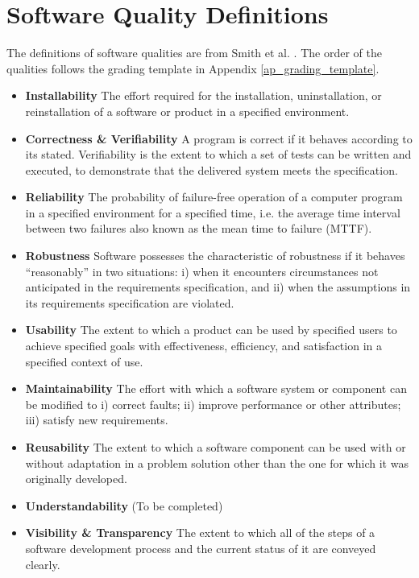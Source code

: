 \section{Software Quality Definitions}
\label{sec_software_quality}

The definitions of software qualities are from Smith et al. \cite{SmithEtAl2020}. The order of the qualities follows the grading template in Appendix \ref{ap_grading_template}.

\begin{itemize}
\item \textbf{Installability} The effort required for the installation, uninstallation, or reinstallation of a software or product in a specified environment.
\item \textbf{Correctness \& Verifiability} A program is correct if it behaves according to its stated. Verifiability is the extent to which a set of tests can be written and executed, to demonstrate that the delivered system meets the specification.
\item \textbf{Reliability} The probability of failure-free operation of a computer program in a specified environment for a specified time, i.e. the average time interval between two failures also known as the mean time to failure (MTTF).
\item \textbf{Robustness} Software possesses the characteristic of robustness if it behaves ``reasonably'' in two situations: i) when it encounters circumstances not anticipated in the requirements specification, and ii) when the assumptions in its requirements specification are violated.
\item \textbf{Usability} The extent to which a product can be used by specified users to achieve specified goals with effectiveness, efficiency, and satisfaction in a specified context of use.
\item \textbf{Maintainability} The effort with which a software system or component can be modified to i) correct faults; ii) improve performance or other attributes; iii) satisfy new requirements.
\item \textbf{Reusability} The extent to which a software component can be used with or without adaptation in a problem solution other than the one for which it was originally developed.
\item \textbf{Understandability} (To be completed)
\item \textbf{Visibility \& Transparency} The extent to which all of the steps of a software development process and the current status of it are conveyed clearly.
\end{itemize}

